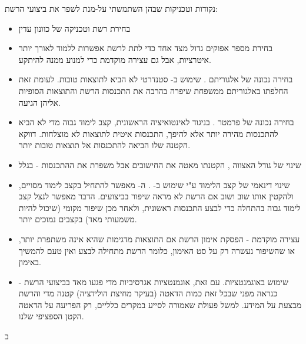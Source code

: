 נקודות וטכניקות שבהן השתמשתי על-מנת לשפר את ביצועי הרשת:

\begin{itemize}
    \item בחירת רשת וטכניקה של כוונון עדין
    \item בחירת מספר אפוקים גדול מצד אחד כדי לתת לרשת אפשרות ללמוד לאורך יותר איטרציות, אבל גם עצירה מוקדמת כדי למנוע ממנה להיתקע.
    \item בחירה נכונה של אלגוריתם . שימוש ב- סטנדרטי לא הביא לתוצאות טובות. לעומת זאת החלפתו באלגוריתם ממשפחת  שיפרה בהרבה את התכנסות הרשת והתוצאות הסופיות אליהן הגיעה.
    \item בחירה נכונה של פרמטר . בניגוד לאינטואיציה הראשונית, קצב לימוד גבוה מדי לא הביא להתכנסות מהירה יותר אלא להיפך, התכנסות איטית לתוצאות לא מוצלחות. דווקא הקטנה שלו הביאה להתכנסות אל תוצאות טובות יותר.
    \item שינוי של גודל האצווה , הקטנתו מאטה את החישובים אבל משפרת את ההתכנסות - בגלל
    \item שינוי דינאמי של קצב הלימוד ע"י שימוש ב- . ה- מאפשר להתחיל בקצב לימוד מסויים, ולהקטין אותו שוב ושוב אם הרשת לא מראה שיפור בביצועים. הדבר מאפשר לנצל קצב לימוד גבוה בהתחלה כדי לבצע התכנסות ראשונית, ולאחר מכן שיפור מקומי (שיכול להיות משמעותי מאד) בקצבים נמוכים יותר.
    \item עצירה מוקדמת  - הפסקת אימון הרשת אם התוצאות מדגימות שהיא אינה משתפרת יותר, או שהשיפור נעשרה רק על סט האימון, כלומר הרשת מתחילה לבצע  ואין טעם להמשיך באימון.
    \item שימוש באוגמנטציות. עם זאת, אוגמנטציות אגרסיביות מדי פגעו מאד בביצועי הרשת - כנראה מפני שבכל זאת כמות הדאטה (בעיקר מחיצת הולידציה) קטנה מדי והרשת מבצעת  על המידע. למשל פעולת  שאמורה לסייע במקרים כלליים, רק הפריעה על הדאטה הקטן הספציפי שלנו.
\end{itemize}

ב

\lstset{
    basicstyle=\ttfamily\tiny, %
    keywordstyle=\bfseries, %
    showstringspaces=false,
    breaklines=true, %
    breakatwhitespace=true, %
    breakindent=0pt, %
    columns=fullflexible, %
    frame=single, %
    numbers=none, %
    xleftmargin=10pt,
    xrightmargin=10pt,
    aboveskip=5pt, %
    belowskip=5pt, %
}

